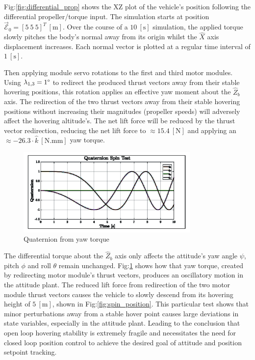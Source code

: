 \par
Fig:\ref{fig:differential_prop} shows the XZ plot of the vehicle's position following the differential propeller/torque input. The simulation starts at position $\vec{\mathcal{E}}_0=[5~5~5]^T~[\text{m}]$. Over the course of a $10~[\text{s}]$ simulation, the applied torque slowly pitches the body's normal away from its origin whilst the $\hat{X}$ axis displacement increases. Each normal vector is plotted at a regular time interval of $1~[\text{s}]$. 
\par
Then applying module servo rotations to the first and third motor modules. Using $\lambda_{1,3}=1\text{\textdegree}$ to redirect the produced thrust vectors away from their stable hovering positions, this rotation applies an effective yaw moment about the $\hat{Z}_b$ axis. The redirection of the two thrust vectors away from their stable hovering positions without increasing their magnitudes (propeller speeds) will adversely affect the hovering altitude's. The net lift force will be reduced by the thrust vector redirection, reducing the net lift force to $\approx 15.4~[\text{N}]$ and applying an $\approx-26.3\cdot\hat{k}~[\text{N.mm}]$ yaw torque.
\begin{figure}[hbtp]
\vspace{-8pt}
\centering
\includegraphics[width=0.8\textwidth]{graphs/spin_quaternion}
\vspace{-6pt}
\caption{Quaternion from yaw torque}
\vspace{-10pt}
\label{fig:spin}
\end{figure}
\par
The differential torque about the $\hat{Z}_b$ axis only affects the attitude's yaw angle $\psi$, pitch $\phi$ and roll $\theta$ remain unchanged. Fig:\ref{fig:spin} shows how that yaw torque, created by redirecting motor module's thrust vectors, produces an oscillatory motion in the attitude plant. The reduced lift force from redirection of the two motor module thrust vectors causes the vehicle to slowly descend from its hovering height of $5~[\text{m}]$, shown in Fig:\ref{fig:spin_position}. This particular test shows that minor perturbations away from a stable hover point causes large deviations in state variables, especially in the attitude plant. Leading to the conclusion that open loop hovering stability is extremely fragile and necessitates the need for closed loop position control to achieve the desired goal of attitude and position setpoint tracking.
